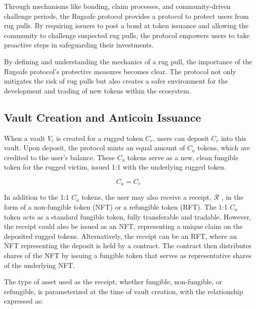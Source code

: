 \documentclass{article}
\begin{document}
Through mechanisms like bonding, claim processes, and community-driven challenge periods, the Rugsafe protocol provides a protocol to protect users from rug pulls. By requiring issuers to post a bond at token issuance and allowing the community to challenge suspected rug pulls, the protocol empowers users to take proactive steps in safeguarding their investments.

By defining and understanding the mechanics of a rug pull, the importance of the Rugsafe protocol's protective measures becomes clear. The protocol not only mitigates the risk of rug pulls but also creates a safer environment for the development and trading of new tokens within the ecosystem.












\subsection{Vault Creation and Anticoin Issuance}
When a vault $V_c$ is created for a rugged token $C_r$, users can deposit $C_r$ into this vault. Upon deposit, the protocol mints an equal amount of $C_a$ tokens, which are credited to the user's balance. These $C_a$ tokens serve as a new, clean fungible token for the rugged victim, issued 1:1 with the underlying rugged token.

\begin{equation}
C_a = C_r
\end{equation}

In addition to the 1:1 $C_a$ tokens, the user may also receive a receipt, \(\mathcal{R} \) , in the form of a non-fungible token (NFT) or a refungible token (RFT). The 1:1 $C_a$ token acts as a standard fungible token, fully transferable and tradable. However, the receipt could also be issued as an NFT, representing a unique claim on the deposited rugged tokens. Alternatively, the receipt can be an RFT, where an NFT representing the deposit is held by a contract. The contract then distributes shares of the NFT by issuing a fungible token that serves as representative shares of the underlying NFT.

The type of asset used as the receipt, whether fungible, non-fungible, or refungible, is parameterized at the time of vault creation, with the relationship expressed as:
\end{document}
